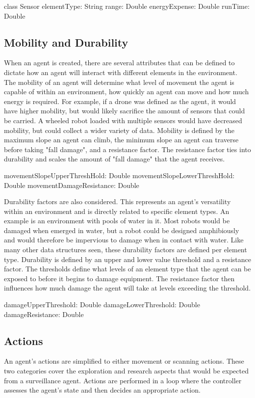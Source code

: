 class Sensor {
  elementType: String
  range: Double
  energyExpense: Double
  runTime: Double
}


\subsection{Mobility and Durability}
When an agent is created, there are several attributes that can be defined to dictate how an agent will interact with different elements in the environment.
The mobility of an agent will determine what level of movement the agent is capable of within an environment, how quickly an agent can move and how much energy is required.
For example, if a drone was defined as the agent, it would have higher mobility, but would likely sacrifice the amount of sensors that could be carried.
A wheeled robot loaded with multiple sensors would have decreased mobility, but could collect a wider variety of data.
Mobility is defined by the maximum slope an agent can climb, the minimum slope an agent can traverse before taking "fall damage", and a resistance factor.
The resistance factor ties into durability and scales the amount of "fall damage" that the agent receives.

movementSlopeUpperThreshHold: Double
movementSlopeLowerThreshHold: Double
movementDamageResistance: Double

Durability factors are also considered.
This represents an agent's versatility within an environment and is directly related to specific element types.
An example is an environment with pools of water in it.
Most robots would be damaged when emerged in water, but a robot could be designed amphibiously and would therefore be impervious to damage when in contact with water.
Like many other data structures seen, these durability factors are defined per element type.
Durability is defined by an upper and lower value threshold and a resistance factor.
The thresholds define what levels of an element type that the agent can be exposed to before it begins to damage equipment.
The resistance factor then influences how much damage the agent will take at levels exceeding the threshold.

damageUpperThreshold: Double
damageLowerThreshold: Double
damageResistance: Double


\subsection{Actions}
An agent's actions are simplified to either movement or scanning actions.
These two categories cover the exploration and research aspects that would be expected from a surveillance agent.
Actions are performed in a loop where the controller assesses the agent's state and then decides an appropriate action.

